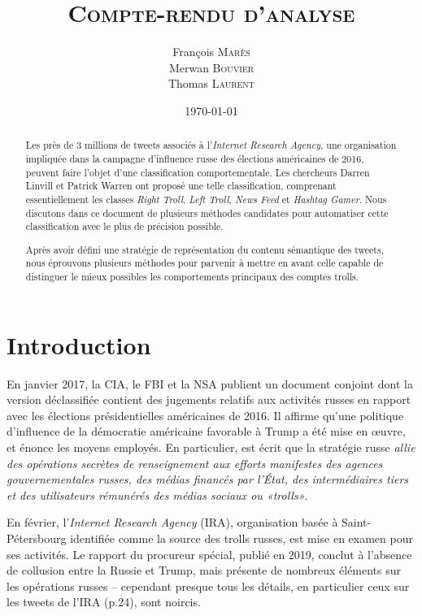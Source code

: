 \documentclass[twocolumn,10pt]{article}
\title{\textsc{Compte-rendu d'analyse}}
\author{François \textsc{Marès}\\ Merwan \textsc{Bouvier}\\ Thomas \textsc{Laurent}}
\date{\today}
\begin{document}
\maketitle %
\thispagestyle{fancy} %

\begin{abstract}
Les près de 3 millions de tweets associés à l'\textit{Internet Research Agency}, une organisation impliquée dans la campagne d'influence russe des élections américaines de 2016, peuvent faire l'objet d'une classification comportementale. Les chercheurs Darren Linvill et Patrick Warren ont proposé une telle classification, comprenant essentiellement les classes \textit{Right Troll}, \textit{Left Troll}, \textit{News Feed} et \textit{Hashtag Gamer}. Nous discutons dans ce document de plusieurs méthodes candidates pour automatiser cette classification avec le plus de précision possible. 

Après avoir défini une stratégie de représentation du contenu sémantique des tweets, nous éprouvons plusieurs méthodes pour parvenir à mettre en avant celle capable de distinguer le mieux possibles les comportements principaux des comptes trolls.


\end{abstract}



\section{Introduction}\label{sec:introduction}

En janvier 2017, la CIA, le FBI et la NSA publient un document conjoint dont la version déclassifiée\cite{ODNI17} contient des jugements relatifs aux activités russes en rapport avec les élections présidentielles américaines de 2016. Il affirme qu'une politique d'influence de la démocratie américaine favorable à Trump a été mise en œuvre, et énonce les moyens employés. En particulier, est écrit que la stratégie russe \textit{allie des opérations secrètes de renseignement aux efforts manifestes des agences gouvernementales russes, des médias financés par l'État, des intermédiaires tiers et des utilisateurs rémunérés des médias sociaux ou «trolls»}.

En février, l'\textit{Internet Research Agency} (IRA), organisation basée à Saint-Pétersbourg identifiée comme la source des trolls russes, est mise en examen pour ses activités. Le rapport du procureur spécial\cite{SCRM19}, publié en 2019, conclut à l'absence de collusion entre la Russie et Trump, mais présente de nombreux éléments sur les opérations russes -- cependant presque tous les détails, en particulier ceux sur les tweets de l'IRA (p.24), sont noircis.
\end{document}
